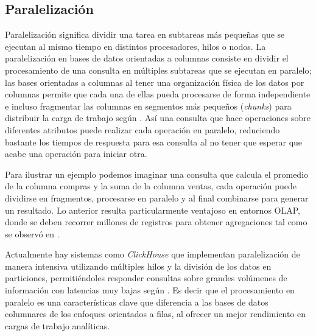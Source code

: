 \subsection{Paralelización}

 Paralelización significa dividir una tarea en subtareas más pequeñas que se ejecutan al mismo tiempo en distintos procesadores, hilos o nodos. La paralelización en bases de datos orientadas a columnas consiste en dividir el procesamiento de una consulta en múltiples subtareas que se ejecutan en paralelo; las bases orientadas a columnas al tener una organización física de los datos por columnas permite que cada una de ellas pueda procesarse de forma independiente e incluso fragmentar las columnas en segmentos más pequeños (\textit{chunks}) para distribuir la carga de trabajo según \cite{abadi2013}. Así una consulta que hace operaciones sobre diferentes atributos puede realizar cada operación en paralelo, reduciendo bastante los tiempos de respuesta para esa consulta al no tener que esperar que acabe una operación para iniciar otra.

 Para ilustrar un ejemplo podemos imaginar una consulta que calcula el promedio de la columna compras y la suma de la columna ventas, cada operación puede dividirse en fragmentos, procesarse en paralelo y al final combinarse para generar un resultado. Lo anterior resulta particularmente ventajoso en entornos OLAP, donde se deben recorrer millones de registros para obtener agregaciones tal como se observó en \cite{kanungo2017}.

 Actualmente hay sistemas como \textit{ClickHouse} que implementan paralelización de manera intensiva utilizando múltiples hilos y la división de los datos en particiones, permitiéndoles responder consultas sobre grandes volúmenes de información con latencias muy bajas según \cite{schulze2024}. Es decir que el procesamiento en paralelo es una características clave que diferencia a las bases de datos columnares de los enfoques orientados a filas, al ofrecer un mejor rendimiento en cargas de trabajo analíticas.
